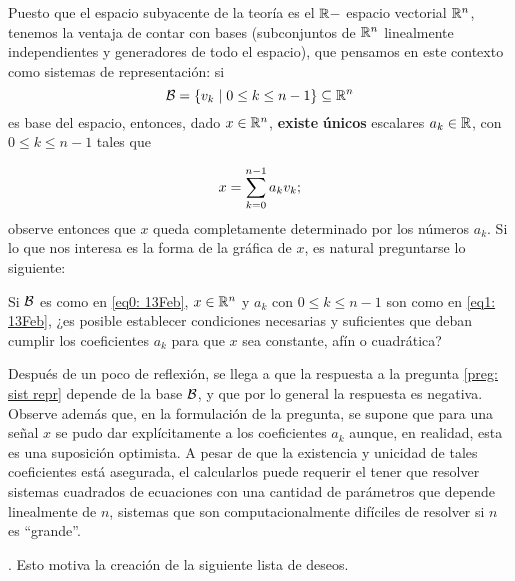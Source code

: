 Puesto que el espacio subyacente de 
la teoría es el $\mathbb{R}-$ espacio vectorial 
$\mathbb{R}^{n}$, tenemos la ventaja de contar con
bases (subconjuntos de $\mathbb{R}^{n}$ linealmente
independientes y generadores de todo el espacio),
que pensamos en este contexto como sistemas
de representación: si 
\begin{equation}
\label{eq0: 13Feb}
\mathcal{B}=\{v_{k}
 \hspace{0.1cm} |
\hspace{0.1cm} 0 \leq k \leq n-1 \} 
\subseteq \mathbb{R}^{n}
\end{equation}
es base del espacio, entonces, dado $x \in \mathbb{R}^{n}$, 
\textbf{existe} \textbf{únicos} escalares
$a_{k} \in \mathbb{R}$, con $0 \leq k \leq n-1$
tales que

\begin{equation}
\label{eq1: 13Feb}
x = \sum\limits_{k=0}^{n-1}a_{k}v_{k};
\end{equation}
observe entonces que $x$ 
queda completamente determinado por los
números $a_{k}$. Si lo que nos interesa es
la forma de la gráfica de $x$, es natural preguntarse lo siguiente:

\begin{preg}
\label{preg: sist repr}
Si $\mathcal{B}$ es como en \eqref{eq0: 13Feb}, $x \in \mathbb{R}^{n}$
y $a_{k}$ con $0 \leq k \leq n-1$ son como en 
\eqref{eq1: 13Feb}, ¿es posible establecer condiciones
necesarias y suficientes que deban cumplir los coeficientes
$a_{k}$ para que $x$ sea constante, afín o cuadrática?
\end{preg}

Después de un poco de reflexión, se llega a que la respuesta 
a la pregunta \ref{preg: sist repr} depende de la base
$\mathcal{B}$, y que por lo general la respuesta es negativa.
Observe además que, en la formulación de la pregunta,
se supone que para una señal $x$ se pudo dar
explícitamente a los coeficientes $a_{k}$ aunque,
en realidad,  esta es una suposición optimista.
A pesar de que la existencia y unicidad de tales
coeficientes está asegurada, el calcularlos
puede requerir el tener que resolver sistemas cuadrados
de ecuaciones con una cantidad de parámetros que
depende linealmente de $n$, sistemas que son computacionalmente
difíciles de resolver si $n$ es ``grande''.

. Esto motiva la
creación de la siguiente lista de deseos.


